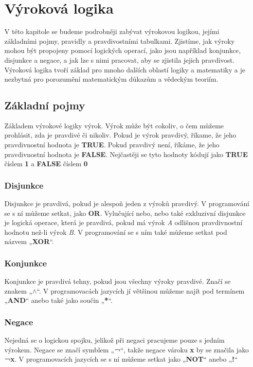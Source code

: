 
\newpage
\chapter{Výroková logika}
V této kapitole se budeme podrobněji zabývat výrokovou logikou, jejími základními pojmy, pravidly a pravdivostními tabulkami.
Zjistíme, jak výroky mohou být propojeny pomocí logických operací, jako jsou například konjunkce, disjunkce a negace, a jak
lze s nimi pracovat, aby se zjistila jejich pravdivost. Výroková logika tvoří základ pro mnoho dalších oblastí logiky a matematiky
a je nezbytná pro porozumění matematickým důkazům a vědeckým teoriím.
    \section{Základní pojmy}
Základem výrokové logiky výrok. Výrok může být cokoliv, o čem můžeme prohlásit, zda je pravdivé či nikoliv. Pokud je výrok pravdivý,
říkame, že jeho pravdivnostní hodnota je \textbf{TRUE}. Pokud pravdivý není, říkáme, že jeho pravdivnostní hodnota je \textbf{FALSE}.
Nejčastěji se tyto hodnoty kódují jako \textbf{TRUE} číslem \textbf{1} a \textbf{FALSE} číslem \textbf{0}
        \subsection{Disjunkce}
Disjunkce je pravdivá, pokud je alespoň jeden z výroků pravdivý. V programování se s ní můžeme setkat, jako \textbf{OR}. Vylučující nebo,
nebo také exkluzivní disjunkce je logická operace, která je pravdivá, pokud má výrok \emph{A} odlišnou pravdivnostní hodnotu než-li výrok
\emph{B}. V programování se s ním také můžeme setkat pod názvem  „\textbf{XOR}“.
        \subsection{Konjunkce}
Konjunkce je pravdivá tehny, pokud jsou všechny výroky pravdivé. Značí se znakem „\(\wedge\)“.
V programovacách jazycích jí většinou můžeme najít pod termínem
„\textbf{AND}“ anebo také jako součin  „\textbf{*}“.
        \subsection{Negace}
Nejedná se o logickou spojku, jelikož při negaci pracujeme pouze s jedním výrokem. Negace se značí symblem  „\textbf{¬}“, takže negace vároku
\textbf{x} by se značila jako \textbf{¬x}. V programovacích jazycích se s ní můžeme setkat jako  „\textbf{NOT}“ anebo  „\textbf{!}“

